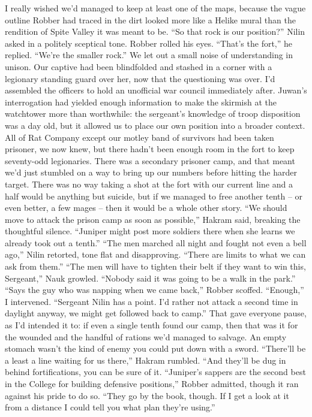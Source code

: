 \documentclass[12pt, openany]{book}
\begin{document}
I really wished we’d managed to keep at least one of the maps, because the vague outline Robber had traced in the dirt looked more like a Helike mural than the rendition of Spite Valley it was meant to be.
“So that rock is our position?” Nilin asked in a politely sceptical tone.
Robber rolled his eyes.
“That’s the fort,” he replied. “We’re the smaller rock.”
We let out a small noise of understanding in unison. Our captive had been blindfolded and stashed in a corner with a legionary standing guard over her, now that the questioning was over. I’d assembled the officers to hold an unofficial war council immediately after. Juwan’s interrogation had yielded enough information to make the skirmish at the watchtower more than worthwhile: the sergeant’s knowledge of troop disposition was a day old, but it allowed us to place our own position into a broader context. All of Rat Company except our motley band of survivors had been taken prisoner, we now knew, but there hadn’t been enough room in the fort to keep seventy-odd legionaries. There was a secondary prisoner camp, and that meant we’d just stumbled on a way to bring up our numbers before hitting the harder target. There was no way taking a shot at the fort with our current line and a half would be anything but suicide, but if we managed to free another tenth – or even better, a few mages – then it would be a whole other story.
“We should move to attack the prison camp as soon as possible,” Hakram said, breaking the thoughtful silence. “Juniper might post more soldiers there when she learns we already took out a tenth.”
“The men marched all night and fought not even a bell ago,” Nilin retorted, tone flat and disapproving. “There are limits to what we can ask from them.”
“The men will have to tighten their belt if they want to win this, Sergeant,” Nauk growled. “Nobody said it was going to be a walk in the park.”
“Says the guy who was napping when we came back,” Robber scoffed.
“Enough,” I intervened. “Sergeant Nilin has a point. I’d rather not attack a second time in daylight anyway, we might get followed back to camp.”
That gave everyone pause, as I’d intended it to: if even a single tenth found our camp, then that was it for the wounded and the handful of rations we’d managed to salvage. An empty stomach wasn’t the kind of enemy you could put down with a sword.
“There’ll be a least a line waiting for us there,” Hakram rumbled. “And they’ll be dug in behind fortifications, you can be sure of it.
“Juniper’s sappers are the second best in the College for building defensive positions,” Robber admitted, though it ran against his pride to do so. “They go by the book, though. If I get a look at it from a distance I could tell you what plan they’re using.”
\end{document}
